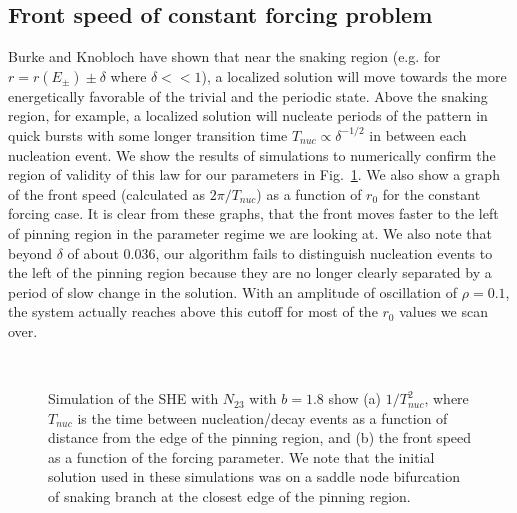\documentclass[pre,preprint,superscriptaddress]{revtex4-1}
\begin{document}
\subsection{Front speed of constant forcing problem}
Burke and Knobloch \cite{burke2006}  have shown that near the snaking region (e.g. for $r=r(E_{\pm})\pm\delta$ where $\delta <<1$), a localized solution will move towards the more energetically favorable of the trivial and the periodic state.  Above the snaking region, for example, a localized solution will nucleate periods of the pattern in quick bursts with some longer transition time $T_{nuc}\propto \delta^{-1/2}$ in between each nucleation event.  We show the results of simulations to numerically confirm the region of validity of this law for our parameters in Fig.~\ref{fig:nucleation}.  We also show a graph of the front speed (calculated as $2 \pi / T_{nuc}$) as a function of $r_0$ for the constant forcing case.   It is clear from these graphs, that the front moves faster to the left of pinning region in the parameter regime we are looking at.  We also note that beyond $\delta$ of about 0.036, our algorithm fails to distinguish nucleation events to the left of the pinning region because they are no longer clearly separated by a period of slow change in the solution.  With an amplitude of oscillation of $\rho = 0.1$, the system actually reaches above this cutoff for most of the $r_0$ values we scan over.   


 \begin{figure}[h!]
  \begin{center}
    \mbox{
       \quad
      }
    \caption{Simulation of the SHE with $N_{23}$ with $b=1.8$ show (a) $1/T_{nuc}^2$, where $T_{nuc}$ is the time between nucleation/decay events as a function of distance from the edge of the pinning region, and (b) the front speed as a function of the forcing parameter. We note that the initial solution used in these simulations was on a saddle node bifurcation of snaking branch at the closest edge of the pinning region.}
    \label{fig:nucleation}
  \end{center}
\end{figure} 
\end{document}
